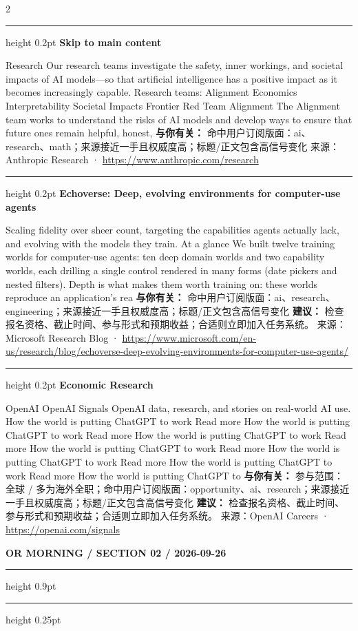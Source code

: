 \documentclass[10.5pt]{ctexart}
\begin{document}
\begin{multicols}{2}
\vspace{2mm}
\hrule height 0.2pt
\vspace{2mm}
{\large\bfseries Skip to main content}\par
Research Our research teams investigate the safety, inner workings, and societal impacts of AI models—so that artificial intelligence has a positive impact as it becomes increasingly capable. Research teams: Alignment Economics Interpretability Societal Impacts Frontier Red Team Alignment The Alignment team works to understand the risks of AI models and develop ways to ensure that future ones remain helpful, honest, 
\textbf{与你有关：} 命中用户订阅版面：ai、research、math；来源接近一手且权威度高；标题/正文包含高信号变化
{\footnotesize\color{ormuted} 来源：Anthropic Research · \url{https://www.anthropic.com/research}}
\vspace{2mm}
\hrule height 0.2pt
\vspace{2mm}
{\large\bfseries Echoverse: Deep, evolving environments for computer-use agents}\par
Scaling fidelity over sheer count, targeting the capabilities agents actually lack, and evolving with the models they train. At a glance We built twelve training worlds for computer-use agents: ten deep domain worlds and two capability worlds, each drilling a single control rendered in many forms (date pickers and nested filters). Depth is what makes them worth training on: these worlds reproduce an application’s rea
\textbf{与你有关：} 命中用户订阅版面：ai、research、engineering；来源接近一手且权威度高；标题/正文包含高信号变化
\textbf{建议：} 检查报名资格、截止时间、参与形式和预期收益；合适则立即加入任务系统。
{\footnotesize\color{ormuted} 来源：Microsoft Research Blog · \url{https://www.microsoft.com/en-us/research/blog/echoverse-deep-evolving-environments-for-computer-use-agents/}}
\vspace{2mm}
\hrule height 0.2pt
\vspace{2mm}
{\large\bfseries Economic Research}\par
OpenAI OpenAI Signals OpenAI data, research, and stories on real-world AI use. How the world is putting ChatGPT to work Read more How the world is putting ChatGPT to work Read more How the world is putting ChatGPT to work Read more How the world is putting ChatGPT to work Read more How the world is putting ChatGPT to work Read more How the world is putting ChatGPT to work Read more How the world is putting ChatGPT to
\textbf{与你有关：} 参与范围：全球 / 多为海外全职；命中用户订阅版面：opportunity、ai、research；来源接近一手且权威度高；标题/正文包含高信号变化
\textbf{建议：} 检查报名资格、截止时间、参与形式和预期收益；合适则立即加入任务系统。
{\footnotesize\color{ormuted} 来源：OpenAI Careers · \url{https://openai.com/signals}}
\end{multicols}
\newpage
{\small\bfseries OR MORNING / SECTION 02 / 2026-09-26}
\vspace{2mm}
\hrule height 0.9pt
\vspace{1.5mm}
\hrule height 0.25pt
\vspace{4mm}
\end{document}
